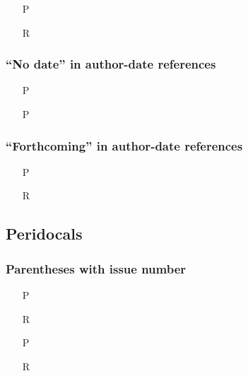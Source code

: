 \documentclass[11pt,letterpaper,oneside]{article}
\begin{document}
\begin{itemize}
\item[P] 

\item[R] 
\end{itemize}

\setcounter{subsubsection}{40}
\subsubsection{``No date'' in author-date references}

\begin{itemize}
\item[P] 


\item[P] 

\end{itemize}

\subsubsection{``Forthcoming'' in author-date references}

\begin{itemize}
\item[P] 

\item[R] 
\end{itemize}

\setcounter{subsection}{2}
\subsection{Peridocals}
\setcounter{subsection}{15}

\setcounter{subsubsection}{45}
\subsubsection{Parentheses with issue number}

\begin{itemize}
\item[P] 

\item[R] 

\item[P] 

\item[R] 
\end{itemize}
\end{document}
